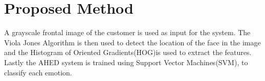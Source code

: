 \section{Proposed Method}
A grayscale frontal image of the customer is used as input for the system. The Viola Jones Algorithm is then used to detect the location of the face in the image and the Histogram of Oriented Gradients(HOG)is used to extract the features. Lastly the AHED system is trained using Support Vector Machines(SVM), to classify each emotion.

